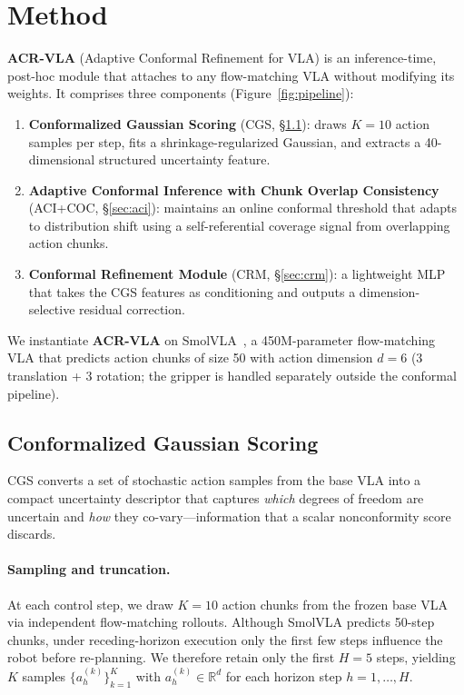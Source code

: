 
\section{Method}
\label{sec:method}

\textbf{ACR-VLA} (Adaptive Conformal Refinement for VLA) is an inference-time, post-hoc module that attaches to any flow-matching VLA without modifying its weights.  It comprises three components (Figure~\ref{fig:pipeline}):
\begin{enumerate}[nosep]
  \item \textbf{Conformalized Gaussian Scoring} (CGS, \S\ref{sec:cgs}): draws $K{=}10$ action samples per step, fits a shrinkage-regularized Gaussian, and extracts a 40-dimensional structured uncertainty feature.
  \item \textbf{Adaptive Conformal Inference with Chunk Overlap Consistency} (ACI+COC, \S\ref{sec:aci}): maintains an online conformal threshold that adapts to distribution shift using a self-referential coverage signal from overlapping action chunks.
  \item \textbf{Conformal Refinement Module} (CRM, \S\ref{sec:crm}): a lightweight MLP that takes the CGS features as conditioning and outputs a dimension-selective residual correction.
\end{enumerate}

We instantiate \textbf{ACR-VLA} on SmolVLA~\cite{smolvla2025}, a 450M-parameter flow-matching VLA that predicts action chunks of size 50 with action dimension $d{=}6$ (3 translation + 3 rotation; the gripper is handled separately outside the conformal pipeline).


\subsection{Conformalized Gaussian Scoring}
\label{sec:cgs}

CGS converts a set of stochastic action samples from the base VLA into a compact uncertainty descriptor that captures \emph{which} degrees of freedom are uncertain and \emph{how} they co-vary---information that a scalar nonconformity score discards.

\paragraph{Sampling and truncation.}
At each control step, we draw $K{=}10$ action chunks from the frozen base VLA via independent flow-matching rollouts.  Although SmolVLA predicts 50-step chunks, under receding-horizon execution only the first few steps influence the robot before re-planning.  We therefore retain only the first $H{=}5$ steps, yielding $K$ samples $\{a_h^{(k)}\}_{k=1}^{K}$ with $a_h^{(k)}\in\mathbb{R}^{d}$ for each horizon step $h=1,\dots,H$.


